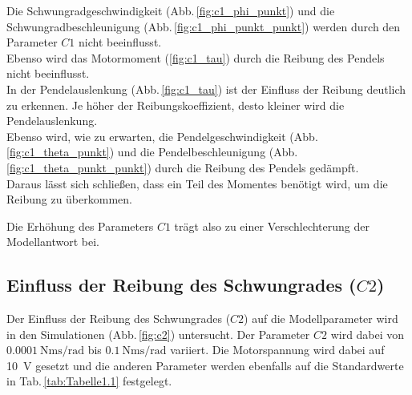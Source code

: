 Die Schwungradgeschwindigkeit (Abb.\,\ref{fig:c1_phi_punkt}) und die Schwungradbeschleunigung (Abb.\,\ref{fig:c1_phi_punkt_punkt}) werden durch den Parameter $C1$ nicht beeinflusst.\\
Ebenso wird das Motormoment (\ref{fig:c1_tau}) durch die Reibung des Pendels nicht beeinflusst.\\

In der Pendelauslenkung (Abb.\,\ref{fig:c1_tau}) ist der Einfluss der Reibung deutlich zu erkennen. Je höher der Reibungskoeffizient, desto kleiner wird die Pendelauslenkung.\\
Ebenso wird, wie zu erwarten, die Pendelgeschwindigkeit (Abb.\,\ref{fig:c1_theta_punkt}) und die Pendelbeschleunigung (Abb.\,\ref{fig:c1_theta_punkt_punkt}) durch die Reibung des Pendels gedämpft.\\
Daraus lässt sich schließen, dass ein Teil des Momentes benötigt wird, um die Reibung zu überkommen. 

Die Erhöhung des Parameters $C1$ trägt also zu einer Verschlechterung der Modellantwort bei.\\

\subsection*{Einfluss der Reibung des Schwungrades ($C2$)}
Der Einfluss der Reibung des Schwungrades ($C2$) auf die Modellparameter wird in den Simulationen (Abb.\,\ref{fig:c2}) untersucht. 
Der Parameter $C2$ wird dabei von $\SI{0.0001}{\newton\meter\second\per\radian}$ bis $\SI{0.1}{\newton\meter\second\per\radian}$ variiert.
Die Motorspannung wird dabei auf \SI{10}{\volt} gesetzt und die anderen Parameter werden ebenfalls auf die Standardwerte in Tab.\,\ref{tab:Tabelle1.1} festgelegt.\\
 
